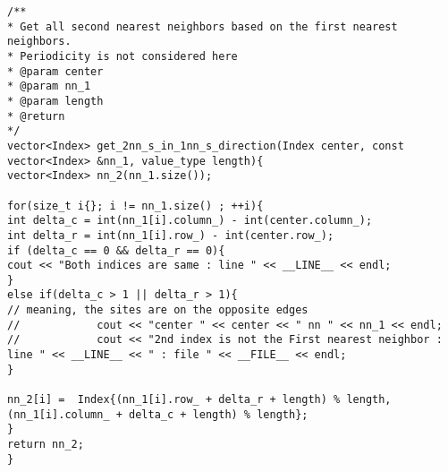 \begin{lstlisting}[style=CStyle]
/**
* Get all second nearest neighbors based on the first nearest neighbors.
* Periodicity is not considered here
* @param center
* @param nn_1
* @param length
* @return
*/
vector<Index> get_2nn_s_in_1nn_s_direction(Index center, const vector<Index> &nn_1, value_type length){
vector<Index> nn_2(nn_1.size());

for(size_t i{}; i != nn_1.size() ; ++i){
int delta_c = int(nn_1[i].column_) - int(center.column_);
int delta_r = int(nn_1[i].row_) - int(center.row_);
if (delta_c == 0 && delta_r == 0){
cout << "Both indices are same : line " << __LINE__ << endl;
}
else if(delta_c > 1 || delta_r > 1){
// meaning, the sites are on the opposite edges
//            cout << "center " << center << " nn " << nn_1 << endl;
//            cout << "2nd index is not the First nearest neighbor : line " << __LINE__ << " : file " << __FILE__ << endl;
}

nn_2[i] =  Index{(nn_1[i].row_ + delta_r + length) % length, (nn_1[i].column_ + delta_c + length) % length};
}
return nn_2;
}
\end{lstlisting}

